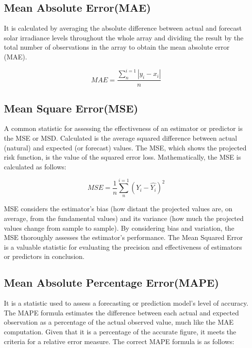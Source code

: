 \subsection{Mean Absolute Error(MAE)}
It is calculated by averaging the absolute difference between actual and forecast solar irradiance levels throughout the whole array and dividing the result by the total number of observations in the array to obtain the mean absolute error (MAE)\cite{kumari2021deep}.

\begin{equation}
MAE = \frac{\sum_{n}^{i=1}|y_i-x_i|}{n}
\end{equation}

\subsection{Mean Square Error(MSE)}
A common statistic for assessing the effectiveness of an estimator or predictor is the MSE or MSD. Calculated is the average squared difference between actual (natural) and expected (or forecast) values. The MSE, which shows the projected risk function, is the value of the squared error loss\cite{kumari2021deep}.
Mathematically, the MSE is calculated as follows:

\begin{equation}
MSE = \frac{1}{n}\sum_{n}^{i=1}(Y_i-\hat{Y_i})^{2}
\end{equation}\cite{8558187}

MSE considers the estimator's bias (how distant the projected values are, on average, from the fundamental values) and its variance (how much the projected values change from sample to sample). By considering bias and variation, the MSE thoroughly assesses the estimator's performance. The Mean Squared Error is a valuable statistic for evaluating the precision and effectiveness of estimators or predictors in conclusion.\cite{gupta2023long}


\subsection{Mean Absolute Percentage Error(MAPE)}
It is a statistic used to assess a forecasting or prediction model's level of accuracy. The MAPE formula estimates the difference between each actual and expected observation as a percentage of the actual observed value, much like the MAE computation. Given that it is a percentage of the accurate figure, it meets the criteria for a relative error measure\cite{dhingra2023pseudo}. The correct MAPE formula is as follows:

